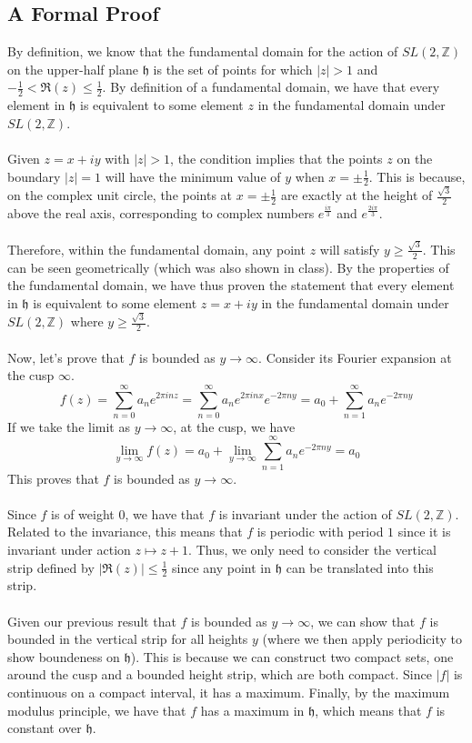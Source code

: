 \subsection{A Formal Proof}
By definition, we know that the fundamental domain for the action of $SL(2,\mathbb{Z})$ on the upper-half plane $\mathfrak{h}$ is the set of points for which $|z| > 1$ and $-\frac{1}{2} < \Re(z) \leq \frac{1}{2}$. 
By definition of a fundamental domain, we have that every element in $\mathfrak{h}$ is equivalent to some element $z$ in the fundamental domain under $SL(2,\mathbb{Z})$.\\
\\
Given $z = x + iy$ with $|z| > 1$, the condition implies that the points $z$ on the boundary $|z| = 1$ will have the minimum value of $y$ when $x = \pm \frac{1}{2}$. This is because, on the complex unit circle, the points at $x = \pm \frac{1}{2}$ are exactly at the height of $\frac{\sqrt{3}}{2}$ above the real axis, corresponding to complex numbers $e^{\frac{i\pi}{3}}$ and $e^{\frac{2i\pi}{3}}$.\\
\\
Therefore, within the fundamental domain, any point $z$ will satisfy $y \geq \frac{\sqrt{3}}{2}$. This can be seen geometrically (which was also shown in class). By the properties of the fundamental domain, we have thus proven the statement that every element in $\mathfrak{h}$ is equivalent to some element $z = x+iy$ in the fundamental domain under $SL(2,\mathbb{Z})$ where $y \geq \frac{\sqrt{3}}{2}$.\\
\\
Now, let's prove that $f$ is bounded as $y \rightarrow \infty$. Consider its Fourier expansion at the cusp $\infty$.
$$
f(z) = \sum_{n=0}^\infty a_n e^{2\pi i n z} = \sum_{n=0}^\infty a_n e^{2\pi i n x} e^{-2\pi n y} = a_0 + \sum_{n=1}^\infty a_n e^{-2\pi n y}
$$
If we take the limit as $y \rightarrow \infty$, at the cusp, we have
$$
\lim_{y\rightarrow \infty} f(z) = a_0 + \lim_{y\rightarrow \infty} \sum_{n=1}^\infty a_n e^{-2\pi n y} = a_0
$$
This proves that $f$ is bounded as $y \rightarrow \infty$.\\
\\
Since $f$ is of weight $0$, we have that $f$ is invariant under the action of $SL(2,\mathbb{Z})$. 
Related to the invariance, this means that $f$ is periodic with period $1$ since it is invariant under action $z \mapsto z + 1$. 
Thus, we only need to consider the vertical strip defined by $|\Re(z)| \leq \frac{1}{2}$ since any point in $\mathfrak{h}$ can be translated into this strip. \\
\\
Given our previous result that $f$ is bounded as $y \rightarrow \infty$, we can show that $f$ is bounded in the vertical strip for all heights $y$ (where we then apply periodicity to show boundeness on $\mathfrak{h}$). This is because we can construct two compact sets, one around the cusp and a bounded height strip, which are both compact. Since $|f|$ is continuous on a compact interval, it has a maximum. Finally, by the maximum modulus principle, we have that $f$ has a maximum in $\mathfrak{h}$, which means that $f$ is constant over $\mathfrak{h}$.

